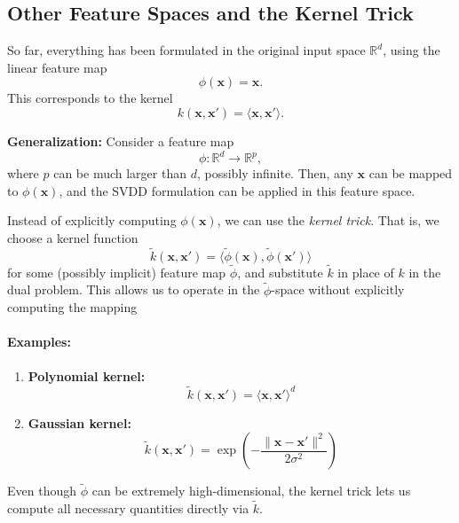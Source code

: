 \documentclass[11pt]{report}
\begin{document}
\subsection{Other Feature Spaces and the Kernel Trick}

So far, everything has been formulated in the original input space 
$\mathbb{R}^d$, using the linear feature map
\[
\phi(\mathbf{x}) = \mathbf{x}.
\]
This corresponds to the kernel
\[
k(\mathbf{x}, \mathbf{x}') = \langle \mathbf{x}, \mathbf{x}' \rangle.
\]

\noindent
\textbf{Generalization:}  
Consider a feature map
\[
\phi: \mathbb{R}^d \to \mathbb{R}^p,
\]
where $p$ can be much larger than $d$, possibly infinite. Then, any 
$\mathbf{x}$ can be mapped to $\phi(\mathbf{x})$, and the SVDD formulation 
can be applied in this feature space.

Instead of explicitly computing $\phi(\mathbf{x})$, we can use the 
\emph{kernel trick}. That is, we choose a kernel function
\[
\tilde{k}(\mathbf{x}, \mathbf{x}') = \langle \tilde{\phi}(\mathbf{x}), \tilde{\phi}(\mathbf{x}') \rangle
\]
for some (possibly implicit) feature map $\tilde{\phi}$, and substitute 
$\tilde{k}$ in place of $k$ in the dual problem. This allows us to operate 
in the $\tilde{\phi}$-space without explicitly computing the mapping \cite{ScholkopfSmola2002}

\paragraph{Examples:}
\begin{enumerate}
    \item \textbf{Polynomial kernel:}
    \[
    \tilde{k}(\mathbf{x}, \mathbf{x}') = \langle \mathbf{x}, \mathbf{x}' \rangle^d
    \]
    \item \textbf{Gaussian kernel:}
    \[
    \tilde{k}(\mathbf{x}, \mathbf{x}') = \exp\left( -\frac{\|\mathbf{x} - \mathbf{x}'\|^2}{2\sigma^2} \right)
    \]
\end{enumerate}

Even though $\tilde{\phi}$ can be extremely high-dimensional, the kernel 
trick lets us compute all necessary quantities directly via $\tilde{k}$.



\nocite{*}
\end{document}
